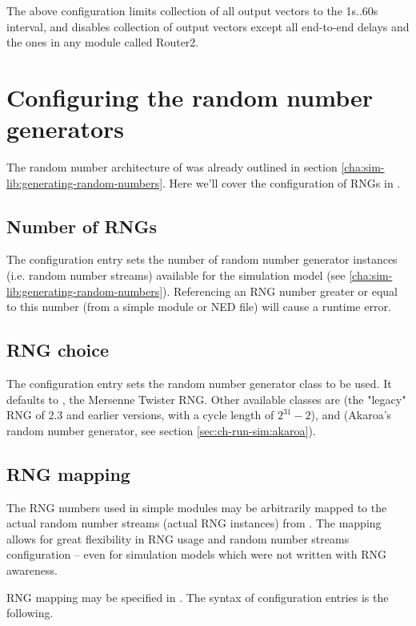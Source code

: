 The above configuration limits collection of all output vectors
to the 1s..60s interval, and disables collection of output vectors
except all end-to-end delays and the ones in any module called Router2.


\section{Configuring the random number generators}
\label{sec:ch-run-sim:rng-config}

The random number architecture of {\opp} was already outlined
in section \ref{cha:sim-lib:generating-random-numbers}. Here
we'll cover the configuration of RNGs in .

\subsection{Number of RNGs}

The  configuration entry sets the number of
random number generator instances (i.e. random number streams)
available for the simulation model (see \ref{cha:sim-lib:generating-random-numbers}).
Referencing an RNG number greater or equal to this number
(from a simple module or NED file) will cause a runtime error.


\subsection{RNG choice}

The  configuration entry sets the random number
generator class to be used. It defaults to ,
the Mersenne Twister RNG. Other available classes are 
(the "legacy" RNG of {\opp} 2.3 and earlier versions, with a cycle length
of $2^31-2$), and  (Akaroa's random number generator,
see section \ref{sec:ch-run-sim:akaroa}).

\subsection{RNG mapping}

The RNG numbers used in simple modules may be arbitrarily mapped to the
actual random number streams (actual RNG instances) from .
The mapping allows for great flexibility in RNG usage and random number
streams configuration -- even for simulation models which were not
written with RNG awareness.

RNG mapping may be specified in . The syntax of
configuration entries is the following.


